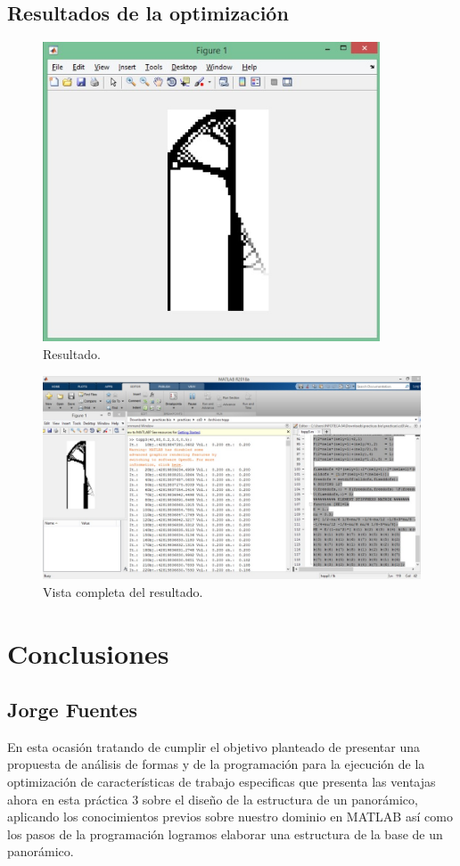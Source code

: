 \documentclass{article}
\begin{document}
\subsection{Resultados de la optimización}
\begin{figure}[htp] %
    \centering
    \includegraphics[width=100mm]{Optimizacion.jpeg} %
    \caption{Resultado.}
    \label{grafica}
\end{figure}
\begin{figure}[htp] %
    \centering
    \includegraphics[width=150mm]{Ejemplo Completo.jpeg} %
    \caption{Vista completa del resultado.}
    \label{grafica}
\end{figure}
 \newpage
\section{Conclusiones}
\subsection{Jorge  Fuentes}
En esta ocasión tratando de cumplir el objetivo planteado de presentar una propuesta de análisis de formas y de la programación para la ejecución de la optimización de características de trabajo especificas que presenta las ventajas ahora en esta práctica 3 sobre el diseño de la estructura de un panorámico, aplicando los conocimientos previos sobre nuestro dominio en MATLAB así como los pasos de la programación logramos elaborar una estructura de la base de un panorámico.
\end{document}
